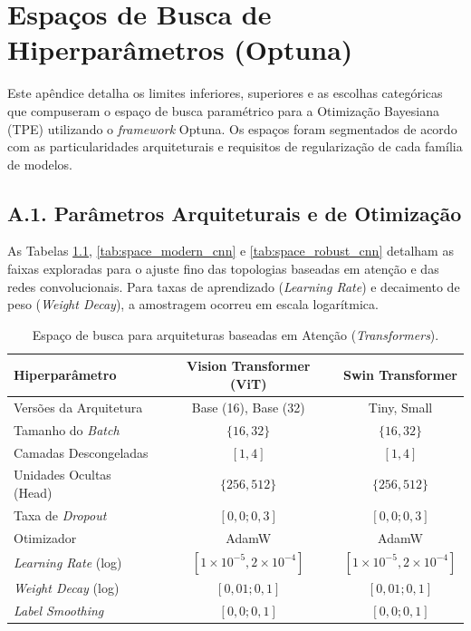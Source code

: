 
\chapter{Espaços de Busca de Hiperparâmetros (Optuna)}
\label{apendice:optuna_search_spaces}

Este apêndice detalha os limites inferiores, superiores e as escolhas categóricas que compuseram o espaço de busca paramétrico para a Otimização Bayesiana (TPE) utilizando o \textit{framework} Optuna. Os espaços foram segmentados de acordo com as particularidades arquiteturais e requisitos de regularização de cada família de modelos.

\section*{A.1. Parâmetros Arquiteturais e de Otimização}

As Tabelas \ref{tab:space_transformers}, \ref{tab:space_modern_cnn} e \ref{tab:space_robust_cnn} detalham as faixas exploradas para o ajuste fino das topologias baseadas em atenção e das redes convolucionais. Para taxas de aprendizado (\textit{Learning Rate}) e decaimento de peso (\textit{Weight Decay}), a amostragem ocorreu em escala logarítmica.

\begin{table}[ht!]
    \centering
    \caption{Espaço de busca para arquiteturas baseadas em Atenção (\textit{Transformers}).}
    \label{tab:space_transformers}
    \begin{tabular}{l c c}
        \toprule
        \textbf{Hiperparâmetro} & \textbf{Vision Transformer (ViT)} & \textbf{Swin Transformer} \\
        \midrule
        Versões da Arquitetura & Base (16), Base (32) & Tiny, Small \\
        Tamanho do \textit{Batch} & $\{16, 32\}$ & $\{16, 32\}$ \\
        Camadas Descongeladas & $[1, 4]$ & $[1, 4]$ \\
        Unidades Ocultas (Head) & $\{256, 512\}$ & $\{256, 512\}$ \\
        Taxa de \textit{Dropout} & $[0,0; 0,3]$ & $[0,0; 0,3]$ \\
        Otimizador & AdamW & AdamW \\
        \textit{Learning Rate} (log) & $[1 \times 10^{-5}, 2 \times 10^{-4}]$ & $[1 \times 10^{-5}, 2 \times 10^{-4}]$ \\
        \textit{Weight Decay} (log) & $[0,01; 0,1]$ & $[0,01; 0,1]$ \\
        \textit{Label Smoothing} & $[0,0; 0,1]$ & $[0,0; 0,1]$ \\
        \bottomrule
    \end{tabular}
\end{table}

